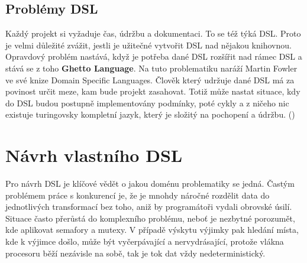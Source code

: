 \documentclass[male,czech]{kithesis}
\begin{document}
{\centering
{}
}

\section{Problémy DSL}

Každý projekt si vyžaduje čas, údržbu a dokumentaci.
To se též týká DSL.
Proto je velmi důležité zvážit, 
jestli je užitečné vytvořit DSL nad nějakou knihovnou.
Opravdový problém nastává, 
když je potřeba dané DSL rozšířit nad rámec DSL a
stává se z toho \textbf{Ghetto Language}.
Na tuto problematiku naráží Martin Fowler ve své knize Domain Specific Languages.
Člověk který udržuje dané DSL má za povinost určit meze,
kam bude projekt zasahovat. 
Totiž může nastat situace,
kdy do DSL budou postupně implementovány podmínky,
poté cykly a 
z ničeho nic existuje turingovsky kompletní jazyk, 
který je složitý na pochopení a údržbu. (\cite[s.~38-39]{Fowlerc2011})


\chapter{Návrh vlastního DSL}

Pro návrh DSL je klíčové vědět o jakou doménu problematiky se jedná.
Častým problémem práce s konkurencí je, 
že je mnohdy náročné rozdělit data do jednotlivých transformací bez toho, 
aniž by programátoři vydali obrovské úsilí.
Situace často přerůstá do komplexního problému, 
neboť je nezbytné porozumět, 
kde aplikovat semafory a mutexy. 
V případě výskytu výjimky pak hledání místa, 
kde k výjimce došlo, 
může být vyčerpávající a nervydrásající,
protože vlákna procesoru běží nezávisle na sobě,
tak je tok dat vždy nedeterministický.
\end{document}
